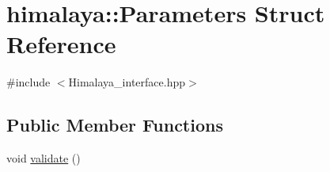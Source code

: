 \hypertarget{structhimalaya_1_1Parameters}{}\section{himalaya\+:\+:Parameters Struct Reference}
\label{structhimalaya_1_1Parameters}


{\ttfamily \#include $<$Himalaya\+\_\+interface.\+hpp$>$}

\subsection*{Public Member Functions}
\begin{DoxyCompactItemize}
\item 
void \hyperlink{structhimalaya_1_1Parameters_a239cad488c1522e1677fc9bb701c420f}{validate} ()
\end{DoxyCompactItemize}
